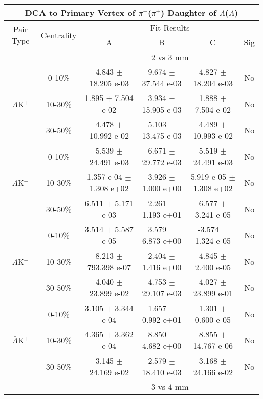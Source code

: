\documentclass[../AnalysisNoteJBuxton.tex]{subfiles}
\begin{document}
\begin{table}
 \centering
 \begin{tabular}{|c|c|c|c|c|c|}
  \multicolumn{6}{c}{DCA to Primary Vertex of $\pi^{-}$($\pi^{+}$) Daughter of $\Lambda$($\bar{\Lambda}$)} \\
  \hline
  \multirow{2}{*}{Pair Type} & \multirow{2}{*}{Centrality} & \multicolumn{4}{c|}{Fit Results} \\
  \cline{3-6}
   & & A & B & C & Sig \\  
  \hline
  \multicolumn{2}{|c}{} & \multicolumn{4}{c|}{2 vs 3 mm} \\  
  \hline  
  \multirow{3}{*}{$\Lambda$K$^{+}$}
   &  0-10\% & 4.843 $\pm$ 18.205 e-03 & 9.674 $\pm$ 37.544 e-03 & 4.827 $\pm$ 18.204 e-03 & No \\
   & 10-30\% & 1.895 $\pm$ 7.504 e-02 & 3.934 $\pm$ 15.905 e-03 & 1.888 $\pm$ 7.504 e-02 & No \\
   & 30-50\% & 4.478 $\pm$ 10.992 e-02 & 5.103 $\pm$ 13.475 e-03 & 4.489 $\pm$ 10.993 e-02 & No \\
  \hline
  \multirow{3}{*}{$\bar{\Lambda}$K$^{-}$}  
   &  0-10\% & 5.539 $\pm$ 24.491 e-03 & 6.671 $\pm$ 29.772 e-03 & 5.519 $\pm$ 24.491 e-03 & No \\
   & 10-30\% & 1.357 e-04 $\pm$ 1.308 e+02 & 3.926 $\pm$ 1.000 e+00 & 5.919 e-05 $\pm$ 1.308 e+02 & No \\
   & 30-50\% & 6.511 $\pm$ 5.171 e-03 & 2.261 $\pm$ 1.193 e+01 & 6.577 $\pm$ 3.241 e-05 & No \\
  \hline \hline
  \multirow{3}{*}{$\Lambda$K$^{-}$}
   &  0-10\% & 3.514 $\pm$ 5.587 e-05 & 3.579 $\pm$ 6.873 e+00 & -3.574 $\pm$ 1.324 e-05 & No \\
   & 10-30\% & 8.213 $\pm$ 793.398 e-07 & 2.404 $\pm$ 1.416 e+00 & 4.845 $\pm$ 2.400 e-05 & No \\
   & 30-50\% & 4.040 $\pm$ 23.899 e-02 & 4.753 $\pm$ 29.107 e-03 & 4.027 $\pm$ 23.899 e-01 & No \\
  \hline
  \multirow{3}{*}{$\bar{\Lambda}$K$^{+}$}  
   &  0-10\% & 3.105 $\pm$ 3.344 e-04 & 1.657 $\pm$ 0.992 e+01 & 1.301 $\pm$ 0.600 e-05 & No \\
   & 10-30\% & 4.365 $\pm$ 3.362 e-04 & 8.850 $\pm$ 4.682 e+00 & 8.855 $\pm$ 14.767 e-06 & No \\
   & 30-50\% & 3.145 $\pm$ 24.169 e-02 & 2.579 $\pm$ 18.410 e-03 & 3.168 $\pm$ 24.166 e-02 & No \\  
  \hline
  \multicolumn{2}{|c}{} & \multicolumn{4}{c|}{3 vs 4 mm} \\

\end{tabular}
\end{table}
\end{document}
